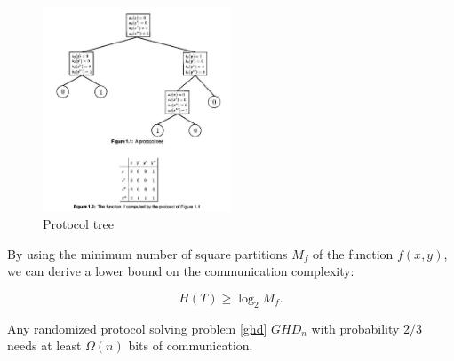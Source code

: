 \begin{figure}
  \centering
  \includegraphics[width=0.5\textwidth]{protocol_tree.png}
  \caption{Protocol tree\cite{kushilevitz1997communication}}
  \label{proto_tree}
\end{figure}

By using the minimum number of square partitions $M_f$ of the function $f(x,y)$, we can derive a lower bound on the communication complexity:

\[
H(T)\ge \log_2 M_f.
\]


\begin{thm}
\label{ghd_lower_bound}
    Any randomized protocol solving problem \ref{ghd} $GHD_n$ with probability $2/3$ needs at least $\Omega(n)$ bits of communication.
\end{thm}

